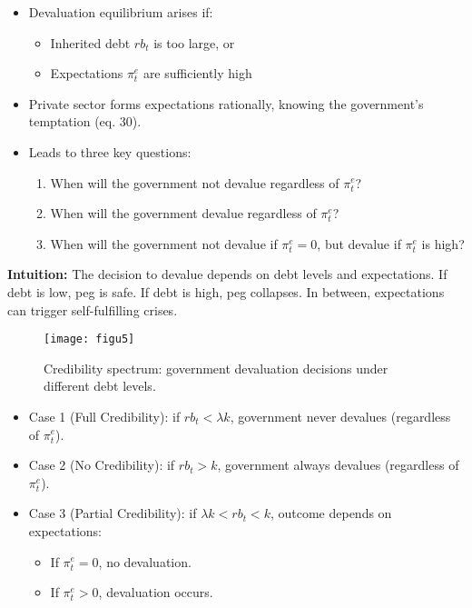 \documentclass[12pt]{article}
\begin{document}
\begin{itemize}
    \item Devaluation equilibrium arises if:
        \begin{itemize}
            \item Inherited debt $rb_t$ is too large, or
            \item Expectations $\pi_t^e$ are sufficiently high
        \end{itemize}
    \item Private sector forms expectations rationally, knowing the government’s temptation (eq. 30).
    \item Leads to three key questions:
        \begin{enumerate}
            \item When will the government not devalue regardless of $\pi_t^e$?
            \item When will the government devalue regardless of $\pi_t^e$?
            \item When will the government not devalue if $\pi_t^e=0$, but devalue if $\pi_t^e$ is high?
        \end{enumerate}
\end{itemize}

\textbf{Intuition:} The decision to devalue depends on debt levels and expectations. If debt is low, peg is safe. If debt is high, peg collapses. In between, expectations can trigger self-fulfilling crises.

\begin{figure}[H]
    \centering
    \texttt{[image: figu5]}
    \caption{Credibility spectrum: government devaluation decisions under different debt levels.}
\end{figure}

\begin{itemize}
    \item Case 1 (Full Credibility): if $rb_t < \lambda k$, government never devalues (regardless of $\pi_t^e$).
    \item Case 2 (No Credibility): if $rb_t > k$, government always devalues (regardless of $\pi_t^e$).
    \item Case 3 (Partial Credibility): if $\lambda k < rb_t < k$, outcome depends on expectations:
        \begin{itemize}
            \item If $\pi_t^e = 0$, no devaluation.
            \item If $\pi_t^e > 0$, devaluation occurs.
        \end{itemize}
\end{itemize}
\end{document}
